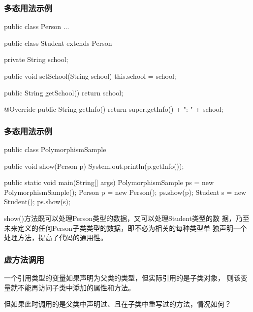 \begin{frame}[fragile] %
\frametitle{多态用法示例}


\begin{javaCode}
  public class Person {...}
\end{javaCode}


\begin{javaCode}
  public class Student extends Person {
    private String school;

    public void setSchool(String school) {
      this.school = school;
    }

    public String getSchool() {
      return school;
    }

    @Override
    public String getInfo() {
      return super.getInfo() + "\tSchool: " + school;
    }
  }
\end{javaCode}
\end{frame}

\begin{frame}[fragile] %
\frametitle{多态用法示例}


\begin{javaCode}

  public class PolymorphismSample {
    public void show(Person p) {
      System.out.println(p.getInfo());
    }
    
    public static void main(String[] args) {
      PolymorphismSample ps = new PolymorphismSample();
      Person p = new Person();
      ps.show(p);
      Student s = new Student();
      ps.show(s);
    }
  }
\end{javaCode}

\pause


{\kai\Mage show()方法既可以处理Person类型的数据，又可以处理Student类型的数
  据，乃至未来定义的任何Person子类类型的数据，即不必为相关的每种类型单
  独声明一个处理方法，提高了代码的通用性。}

\end{frame}

\begin{frame}[fragile] %
\frametitle{虚方法调用}

{\Mage 一个引用类型的变量如果声明为父类的类型，但实际引用的是子类对象，
  则该变量就不能再访问子类中添加的属性和方法。}

\pause

\begin{block}{}
  但如果此时调用的是父类中声明过、且在子类中重写过的方法，情况如何？  
\end{block}

\end{frame}

